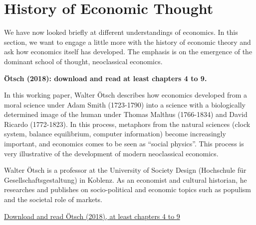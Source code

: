 \documentclass[
  british,
  a4paper,
  DIV=11,
  numbers=noendperiod,
  oneside,
  openany]{scrreprt}
\begin{document}
\section{History of Economic Thought}\label{history-of-economic-thought}

We have now looked briefly at different understandings of economics. In
this section, we want to engage a little more with the history of
economic theory and ask how economics itself has developed. The emphasis
is on the emergence of the dominant school of thought, neoclassical
economics.

\begin{tcolorbox}[enhanced jigsaw, arc=.35mm, bottomrule=.15mm, bottomtitle=1mm, breakable, colback=white, colbacktitle=quarto-callout-caution-color!10!white, colframe=quarto-callout-caution-color-frame, coltitle=black, left=2mm, leftrule=.75mm, opacityback=0, opacitybacktitle=0.6, rightrule=.15mm, title={Mandatory reading}, titlerule=0mm, toprule=.15mm, toptitle=1mm]

\textbf{Ötsch (2018): download and read at least chapters 4 to 9.}

In this working paper, Walter Ötsch describes how economics developed
from a moral science under Adam Smith (1723-1790) into a science with a
biologically determined image of the human under Thomas Malthus
(1766-1834) and David Ricardo (1772-1823). In this process, metaphors
from the natural sciences (clock system, balance equilibrium, computer
information) become increasingly important, and economics comes to be
seen as ``social physics''. This process is very illustrative of the
development of modern neoclassical economics.

Walter Ötsch is a professor at the University of Society Design
(Hochschule für Gesellschaftsgestaltung) in Koblenz. As an economist and
cultural historian, he researches and publishes on socio-political and
economic topics such as populism and the societal role of markets.

\href{https://ilias.unibe.ch/go/file/3524254}{Download and read Ötsch
(2018), at least chapters 4 to 9}

\end{tcolorbox}
\end{document}
